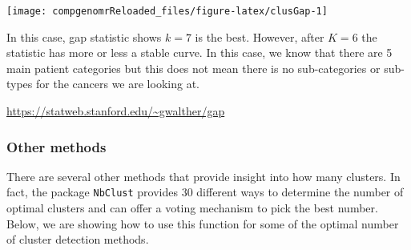 \documentclass[12pt,]{krantz}
\newenvironment{Shaded}{\begin{snugshade}}{\end{snugshade}}
\newcommand{\CommentTok}[1]{\textcolor[rgb]{0.56,0.35,0.01}{\textit{#1}}}
\newcommand{\DataTypeTok}[1]{\textcolor[rgb]{0.13,0.29,0.53}{#1}}
\newcommand{\DecValTok}[1]{\textcolor[rgb]{0.00,0.00,0.81}{#1}}
\newcommand{\KeywordTok}[1]{\textcolor[rgb]{0.13,0.29,0.53}{\textbf{#1}}}
\newcommand{\NormalTok}[1]{#1}
\newcommand{\OperatorTok}[1]{\textcolor[rgb]{0.81,0.36,0.00}{\textbf{#1}}}
\newcommand{\StringTok}[1]{\textcolor[rgb]{0.31,0.60,0.02}{#1}}
\theoremstyle{definition}
\theoremstyle{definition}
\theoremstyle{definition}
\theoremstyle{remark}
\begin{document}
\begin{center}\texttt{[image: compgenomrReloaded\_files/figure-latex/clusGap-1]} \end{center}

In this case, gap statistic shows \(k=7\) is the best. However, after
\(K=6\) the statistic has more or less a stable curve. In this case, we
know that there are 5 main patient categories but this does not mean
there is no sub-categories or sub-types for the cancers we are looking
at.

\url{https://statweb.stanford.edu/~gwalther/gap}

\hypertarget{other-methods}{%
\subsubsection{Other methods}\label{other-methods}}

There are several other methods that provide insight into how many
clusters. In fact, the package \texttt{NbClust} provides 30 different
ways to determine the number of optimal clusters and can offer a voting
mechanism to pick the best number. Below, we are showing how to use this
function for some of the optimal number of cluster detection methods.

\begin{Shaded}
\end{Shaded}
\end{document}
